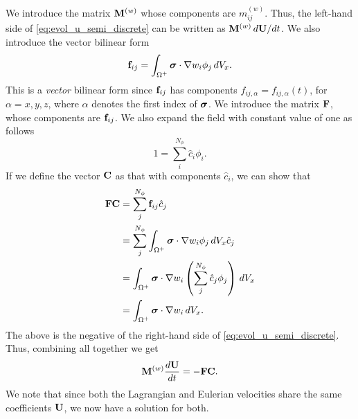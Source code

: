\documentclass[11pt]{article}
\begin{document}
We introduce the matrix $\mathbf{M}^{(w)}$ whose components are $m_{ij}^{(w)}$. Thus, the left-hand side of \cref{eq:evol_u_semi_discrete} can be written as $\mathbf{M}^{(w)} \, d\mathbf{U} / dt$.
We also introduce the vector bilinear form
\begin{equation}
    \mathbf{f}_{ij} = \int_{\Omega^+} \bm \sigma \cdot \nabla w_i \phi_j \, dV_x.
\end{equation}
This is a \textit{vector} bilinear form since $\mathbf{f}_{ij}$ has components $f_{ij,\alpha} = f_{ij,\alpha}(t)$, for $\alpha = x,y,z$, where $\alpha$ denotes the first index of $\bm \sigma$. We introduce the matrix $\mathbf{F}$, whose components are $\mathbf{f}_{ij}$. We also expand the field with constant value of one as follows
\begin{equation}
    1 = \sum_i^{N_\phi} \hat{c}_i \phi_i.
\end{equation}
If we define the vector $\mathbf{C}$ as that with components $\hat{c}_i$, we can show that 
\begin{align}
    \mathbf{F} \mathbf{C} &= \sum_j^{N_\phi} \mathbf{f}_{ij} \hat{c}_j \nonumber \\
    &= \sum_j^{N_\phi} \int_{\Omega^+} \bm \sigma \cdot \nabla w_i \phi_j \, dV_x \hat{c}_j \nonumber \\
    &= \int_{\Omega^+} \bm \sigma \cdot \nabla w_i \left ( \sum_j^{N_\phi} \hat{c}_j \phi_j \right ) \, dV_x \nonumber \\
    &= \int_{\Omega^+} \bm \sigma \cdot \nabla w_i \, dV_x.
\end{align}
The above is the negative of the right-hand side of \cref{eq:evol_u_semi_discrete}. Thus, combining all together we get
\begin{equation}
    \mathbf{M}^{(w)} \frac{d\mathbf{U}}{dt} = -\mathbf{F} \mathbf{C}.
\end{equation}
We note that since both the Lagrangian and Eulerian velocities share the same coefficients $\mathbf{U}$, we now have a solution for both.

\end{document}
